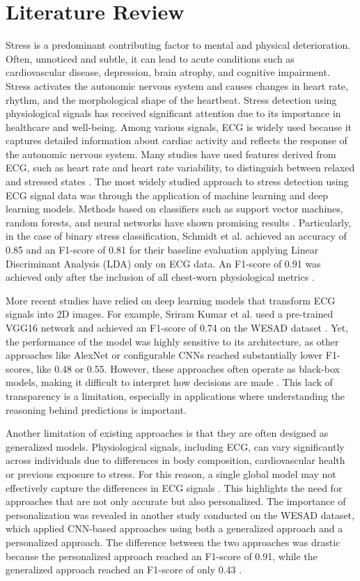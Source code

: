 \documentclass[conference,10pt]{IEEEtran}
\begin{document}
\section{Literature Review}

Stress is a predominant contributing factor to mental and physical deterioration. Often, unnoticed and subtle, it can lead to acute conditions such as cardiovascular disease, depression, brain atrophy, and cognitive impairment\cite{r8}. Stress activates the autonomic nervous system and causes changes in heart rate, rhythm, and the morphological shape of the heartbeat.
Stress detection using physiological signals has received significant attention due to its importance in healthcare and well-being. Among various signals, ECG is widely used because it captures detailed information about cardiac activity and reflects the response of the autonomic nervous system. Many studies have used features derived from ECG, such as heart rate and heart rate variability, to distinguish between relaxed and stressed states \cite{r1,r2}.
The most widely studied approach to stress detection using ECG signal data was through the application of machine learning and deep learning models. Methods based on classifiers such as support vector machines, random forests, and neural networks have shown promising results \cite{r3,r5}.
Particularly, in the case of binary stress classification, Schmidt et al. achieved an accuracy of 0.85 and an F1-score of 0.81 for their baseline evaluation applying Linear Discriminant Analysis (LDA) only on ECG data. An F1-score of 0.91 was achieved only after the inclusion of all chest-worn physiological metrics \cite{r3}.

More recent studies have relied on deep learning models that transform ECG signals into 2D images. For example, Sriram Kumar et al. used a pre-trained VGG16 network and achieved an F1-score of 0.74 on the WESAD dataset \cite{r9}. Yet, the performance of the model was highly sensitive to its architecture, as other approaches like AlexNet or configurable CNNs reached substantially lower F1-scores, like 0.48 or 0.55. 
However, these approaches often operate as black-box models, making it difficult to interpret how decisions are made \cite{r4}. This lack of transparency is a limitation, especially in applications where understanding the reasoning behind predictions is important.

Another limitation of existing approaches is that they are often designed as generalized models. Physiological signals, including ECG, can vary significantly across individuals due to differences in body composition, cardiovascular health or previous exposure to stress. For this reason, a single global model may not effectively capture the differences in ECG signals \cite{r5}. 
This highlights the need for approaches that are not only accurate but also personalized.
The importance of personalization was revealed in another study conducted on the WESAD dataset, which applied CNN-based approaches using both a generalized approach and a personalized approach. The difference between the two approaches was drastic because the personalized approach reached an F1-score of 0.91, while the generalized approach reached an F1-score of only 0.43 \cite{r10}.
\end{document}

